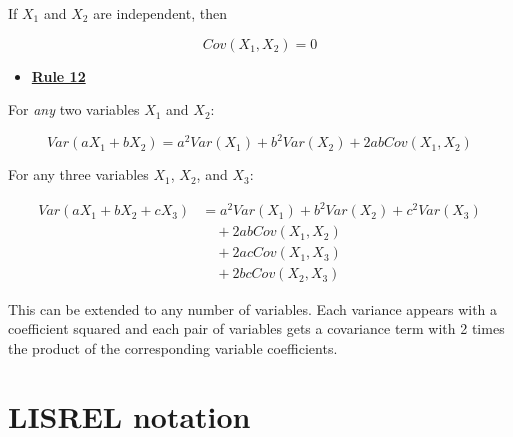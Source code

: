 \documentclass[
]{book}
\providecommand{\tightlist}{%
  \setlength{\itemsep}{0pt}\setlength{\parskip}{0pt}}
\begin{document}
If \(X_{1}\) and \(X_{2}\) are independent, then

\[
Cov\left(X_{1}, X_{2}\right) = 0
\]

\begin{itemize}
\tightlist
\item
  \href{./covariance.html\#Rule12}{\textbf{Rule 12}}
\end{itemize}

For \emph{any} two variables \(X_{1}\) and \(X_{2}\):

\[
Var(aX_{1} + bX_{2}) = 
    a^2Var(X_{1}) + b^2Var(X_{2}) + 2abCov(X_{1}, X_{2})
\]

For any three variables \(X_{1}\), \(X_{2}\), and \(X_{3}\):

\begin{align}
Var(aX_{1} + bX_{2} + cX_{3}) &= 
    a^2Var(X_{1}) + b^2Var(X_{2}) + c^2Var(X_{3}) \\
    & \quad + 2abCov(X_{1}, X_{2}) \\
    & \quad + 2acCov(X_{1}, X_{3}) \\
    & \quad + 2bcCov(X_{2}, X_{3})
\end{align}

This can be extended to any number of variables. Each variance appears with a coefficient squared and each pair of variables gets a covariance term with 2 times the product of the corresponding variable coefficients.

\hypertarget{appendix-lisrel}{%
\chapter{LISREL notation}\label{appendix-lisrel}}

  
\end{document}
